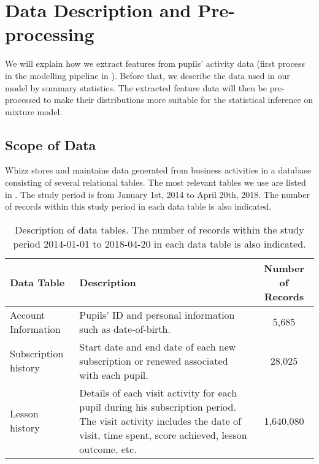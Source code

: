 \section{Data Description and Pre-processing}
\label{sec:data}

We will explain how we extract features from pupils' activity data (first process in the modelling pipeline in ). Before that, we describe the data used in our model by summary statistics. The extracted feature data will then be pre-processed to make their distributions more suitable for the statistical inference on mixture model. 

\subsection{Scope of Data}
\label{sec:dataScope}

Whizz stores and maintains data generated from business activities in a database consisting of several relational tables. The most relevant tables we use are listed in . The study period is from January 1st, 2014 to April 20th, 2018. The number of records within this study period in each data table is also indicated.

\begin{table}[!h]
\centering
\footnotesize
\begin{tabular}{l|p{7cm}|c}
\hline
\textbf{Data Table} & \textbf{Description} & \textbf{Number of Records} \\
\hline
Account Information &
Pupils' ID and personal information such as date-of-birth. &
5,685 \\
\hline
Subscription history &
Start date and end date of each new subscription or renewed associated with each pupil. &
28,025 \\
\hline
Lesson history &
Details of each visit activity for each pupil during his subscription period. The visit activity includes the date of visit, time spent, score achieved, lesson outcome, etc. &
1,640,080 \\
\hline
\end{tabular}
\caption{Description of data tables. The number of records within the study period 2014-01-01 to 2018-04-20 in each data table is also indicated.}
\label{tab:dataTable}
\end{table}

